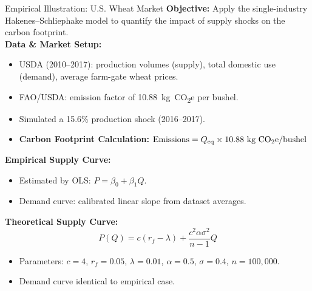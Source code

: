 \documentclass{beamer}
\begin{document}
\begin{frame}{Empirical Illustration: U.S. Wheat Market}
\footnotesize
\vspace{-2.5em}
\textbf{Objective:} Apply the single-industry Hakenes--Schliephake model to quantify the impact of supply shocks on the carbon footprint.\\
\pause
\vspace{0.5em}
\textbf{Data \& Market Setup:}
\begin{itemize}
  \item USDA (2010--2017): production volumes (supply), total domestic use (demand), average farm-gate wheat prices.
  \item FAO/USDA: emission factor of 10.88~kg~CO\textsubscript{2}e per bushel.
\item Simulated a 15.6\% production shock (2016–2017).
\item \textbf{Carbon Footprint Calculation: }$
\text{Emissions} = Q_{\text{eq}} \times 10.88 \text{ kg CO\textsubscript{2}e/bushel}
$

\end{itemize}

\pause
\textbf{Empirical Supply Curve:}
\begin{itemize}
  \item Estimated by OLS: \( P = \beta_0 + \beta_1 Q \).
  \item Demand curve: calibrated linear slope from dataset averages.
  
\end{itemize}
\pause
\textbf{Theoretical Supply Curve:}
\[
P(Q) = c(r_f - \lambda) + \frac{c^2 \alpha \sigma^2}{n - 1} Q
\]
\begin{itemize}
  \item Parameters: \(c = 4\), \(r_f = 0.05\), \(\lambda = 0.01\), \(\alpha = 0.5\), \(\sigma = 0.4\), \(n = 100{,}000\).
  \item Demand curve identical to empirical case.
\end{itemize}
\end{frame}

\end{document}
